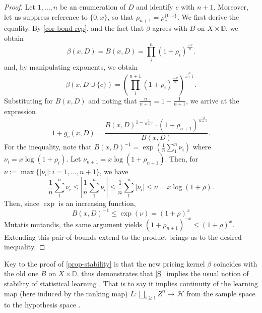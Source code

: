 \documentclass[ecta,nameyear,draft]{econsocart}
\newcommand{\mc}{\mathcal}
\newcommand{\mbbd}{{\mathds D}}
\newcommand{\stability}{\ref{S}}
\theoremstyle{plain}
\theoremstyle{remark}
\begin{document}
\begin{proof}
  Let $1, \dots, n$ be an enumeration of $D$ and identify $c$ with $n+1$.
  Moreover, let us suppress reference to $\{0, x\}$, so that $\rho_{n+1} =
  \rho_{c}^{\{0, x\}}$. We first derive the equality. By \cref{cor-bond-rep},
  and the fact that $\beta$ agrees with $B$ on $X \times \mbbd$, we obtain 
  \begin{equation*} \beta(x, D) = B(x, D) =
    \prod_{i}^{n} \left(1 + \rho_{i}\right)^\frac{-x}{n} .
  \end{equation*}
  and, by manipulating exponents, we obtain
  \begin{equation*}\beta(x, D \cup \{c\}) =
    \left(\prod_{i}^{n+1} \left(1 +
    \rho_{i}\right)^\frac{-x}{n}\right)^\frac{n}{n+1}.
  \end{equation*}
  Substituting for $B(x, D)$ and noting that $\frac{n}{n+1} = 1 -
  \frac{1}{n+1}$, we arrive at the expression
  \begin{equation*}
    1 + g_c(x, D) = \frac{B(x, D)^{1 - \frac{1}{n+1}} \cdot \left (1 +
    \rho_{n+1} \right)^\frac{-x}{n+1}}{B(x, D)}.  
  \end{equation*}
  For the inequality, note that $B(x, D)^{-1} = \exp(\frac{1}{n}\sum_{1}^{n}
  \nu_i)$ where $\nu_i = x\log(1+\rho_i)$. Let $\nu_{n+1} = x \log(1 +
  \rho_{n+1})$.  Then, for $\nu := \max\{\lvert \nu_i \rvert : i = 1, \dots,
  n+1\}$, we have
  \begin{equation*}
    \frac{1}{n}\sum_{1}^{n} \nu_i \leq \left \lvert \frac{1}{n}\sum_{1}^{n}
    \nu_i\right \rvert \leq \frac{1}{n} \sum_1^n \lvert \nu_i \rvert \leq \nu =
    x \log (1 + \rho).
  \end{equation*}
  Then, since $\exp$ is an increasing function,
  \begin{equation*}
    B(x, D)^{-1} \leq \exp (\nu) = (1 + \rho)^{x}
  \end{equation*}
  Mutatis mutandis, the same argument yields $(1 + \rho_{n+1})^{-x} \leq (1 +
  \rho)^{x}$. Extending this pair of bounds extend to the product brings us to
  the desired inequality. 
\end{proof}

Key to the proof of \cref{prop-stability} is that the new pricing kernel
$\beta$ coincides with the old one $B$ on $X \times \mbbd$.
 thus demonstrates that \stability\ implies the usual
notion of stability of statistical learning
\citep{poggio2004general,mukherjee2006learning,bousquet2002stability}. That is
to say it implies continuity of the learning map (here induced by the ranking
map) $L:\bigsqcup_{i \geq 1} Z^n \rightarrow \mc H$ from the sample space to
the hypothesis space \citep{mukherjee2006learning}.  
\end{document}
